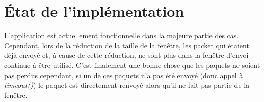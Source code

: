 \documentclass{article}
\begin{document}
\section{\'Etat de l'implémentation}
L'application est actuellement fonctionnelle dans la majeure partie des cas.
Cependant, lors de la réduction de la taille de la fenêtre, les packet qui étaient déjà envoyé et, à cause de cette réduction,
ne sont plus dans la fenêtre d'envoi continue à être utilisé. C'est finalement une bonne chose que les paquets ne soient pas perdus cependant, 
si un de ces paquets n'a pas été envoyé (donc appel à \emph{timeout()}) le paquet est directement renvoyé alors qu'il ne fait pas partie de la fenêtre.
\end{document}
